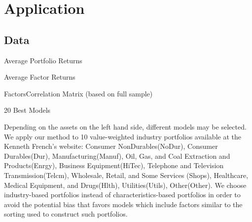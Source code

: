 \section{Application}
\subsection{Data}

\begin{sidewaystable}[ht]
	\centering
	
	\label{table:avPortfolioReturns}	
	\caption{Average Portfolio Returns}
	\bigskip\bigskip
	
	\caption{Average Factor Returns}
	\label{table:avFactorReturns}	
\end{sidewaystable}

\begin{sidewaystable}[ht]
	\centering
	
	\caption{FactorsCorrelation Matrix (based on full sample)}
	\label{table:correlation}
\end{sidewaystable}

\begin{sidewaystable}[ht]
	\centering
	
	\caption{20 Best Models}
	\label{table:bestModels}
\end{sidewaystable}

Depending on the assets on the left hand side, different models may be selected.
We apply our method to 10 value-weighted industry portfolios available at the Kenneth French's website: Consumer NonDurables(NoDur), Consumer Durables(Dur), Manufacturing(Manuf),  Oil, Gas, and Coal Extraction and Products(Enrgy), Business Equipment(HiTec),   Telephone and Television Transmission(Telcm),   Wholesale, Retail, and Some Services (Shops),
Healthcare, Medical Equipment, and Drugs(Hlth),
Utilities(Utils), Other(Other). 
We choose industry-based portfolios instead of characteristics-based portfolios in order to avoid the potential bias that favors models which include factors similar to the sorting used to construct such portfolios.

